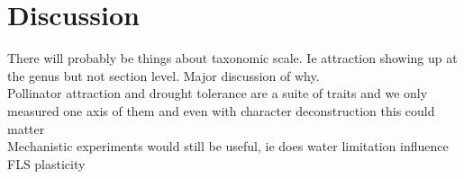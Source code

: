 \documentclass{article}\usepackage[]{graphicx}\usepackage[]{color}
\begin{document}
\section*{Discussion}
There will probably be things about taxonomic scale. Ie attraction showing up at the genus but not section level. Major discussion of why. \\
Pollinator attraction and drought tolerance are a suite of traits and we only measured one axis of them and even with character deconstruction this could matter\\
Mechanistic experiments would still be useful, ie does water limitation influence FLS plasticity
\end{document}
